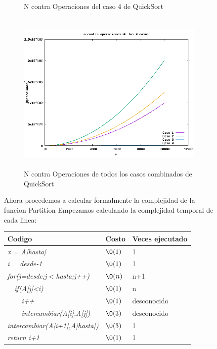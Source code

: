 \documentclass[spanish]{article}
\begin{document}
\begin{figure}[h!]
\begin{figure}[H]
		\caption{N contra Operaciones del caso 4 de QuickSort}
	\end{figure}	
	\begin{figure}[H]
		\centering
		\includegraphics[width=400px,height=300px]{grafica7}
		\caption{N contra Operaciones de todos los casos combinados de QuickSort}
	\end{figure}	
	Ahora procedemos a calcular formalmente la complejidad de la funcion Partition
	Empezamos calculando la complejidad temporal de cada linea:
	\begin{center}
		\begin{table}[H]
			\begin{tabular}{|l|l|l|}
				\hline
				\rowcolor[HTML]{FFCC67} 
				Codigo                           & Costo & Veces ejecutado \\ \hline
				\textit{x = A[hasta]}                    & $\O(1)$    & 1               \\ \hline
				\textit{i = desde-1}                    & $\O(1)$    & 1               \\ \hline
				\textit{for(j=desde;j$<$hasta;j++)} & $\O(n)$    & n+1             \\ \hline
				\textit{\  \  if(A[j]<i)}                 & $\O(1)$    & n               \\ \hline
				\textit{\  \  \  \  i++}                     & $\O(1)$    & desconocido               \\ \hline
				\textit{\  \  \  \  intercambiar(A[i],A[j])}                     & $\O(3)$    & desconocido               \\ \hline
				\textit{intercambiar(A[i+1],A[hasta])}                     & $\O(3)$    & 1               \\ \hline
				\textit{return i+1}                & $\O(1)$    & 1               \\ \hline

\end{tabular}
\end{table}
\end{center}
\end{figure}
\end{document}
